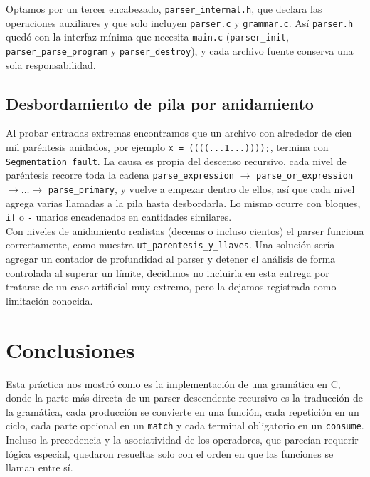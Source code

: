 \documentclass[12pt,letterpaper]{article}
\begin{document}
Optamos por un tercer encabezado, \texttt{parser\_internal.h}, que declara las operaciones auxiliares y que
solo incluyen \texttt{parser.c} y \texttt{grammar.c}. Así \texttt{parser.h} quedó con la interfaz mínima que
necesita \texttt{main.c} (\texttt{parser\_init}, \texttt{parser\_parse\_program} y \texttt{parser\_destroy}),
y cada archivo fuente conserva una sola responsabilidad.

\subsection*{Desbordamiento de pila por anidamiento}

Al probar entradas extremas encontramos que un archivo con alrededor de cien mil paréntesis anidados, por
ejemplo \texttt{x = ((((...1...))));}, termina con \texttt{Segmentation fault}. La causa es propia del descenso
recursivo, cada nivel de paréntesis recorre toda la cadena \texttt{parse\_expression}
$\rightarrow$ \texttt{parse\_or\_expression} $\rightarrow \dots \rightarrow$ \texttt{parse\_primary}, y vuelve
a empezar dentro de ellos, así que cada nivel agrega varias llamadas a la pila hasta desbordarla. Lo mismo
ocurre con bloques, \texttt{if} o \texttt{-} unarios encadenados en cantidades similares.\\

Con niveles de anidamiento realistas (decenas o incluso cientos) el parser funciona correctamente, como
muestra \texttt{ut\_parentesis\_y\_llaves}. Una solución sería agregar un contador de profundidad al parser y
detener el análisis de forma controlada al superar un límite, decidimos no incluirla en esta entrega por
tratarse de un caso artificial muy extremo, pero la dejamos registrada como limitación conocida.


\bigskip


\section*{Conclusiones}

Esta práctica nos mostró como es la implementación de una gramática en C, donde la parte más directa de un
parser descendente recursivo es la traducción de la gramática, cada producción se convierte en una función,
cada repetición en un ciclo, cada parte opcional en un \texttt{match} y cada terminal obligatorio en un
\texttt{consume}. Incluso la precedencia y la asociatividad de los operadores, que parecían requerir lógica
especial, quedaron resueltas solo con el orden en que las funciones se llaman entre sí.\\
\end{document}
